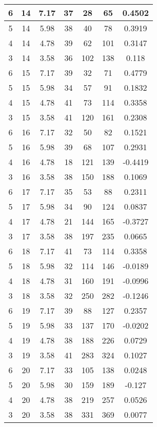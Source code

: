 \documentclass[letterpaper, 12pt]{article}
\begin{document}
\begin{longtable}{|c|c|c|c|c|c|c|}
\hline
6 & 14 & 7.17 & 37 & 28 & 65 & 0.4502 \\
\hline
5 & 14 & 5.98 & 38 & 40 & 78 & 0.3919 \\
\hline
4 & 14 & 4.78 & 39 & 62 & 101 & 0.3147 \\
\hline
3 & 14 & 3.58 & 36 & 102 & 138 & 0.118 \\
\hline
6 & 15 & 7.17 & 39 & 32 & 71 & 0.4779 \\
\hline
5 & 15 & 5.98 & 34 & 57 & 91 & 0.1832 \\
\hline
4 & 15 & 4.78 & 41 & 73 & 114 & 0.3358 \\
\hline
3 & 15 & 3.58 & 41 & 120 & 161 & 0.2308 \\
\hline
6 & 16 & 7.17 & 32 & 50 & 82 & 0.1521 \\
\hline
5 & 16 & 5.98 & 39 & 68 & 107 & 0.2931 \\
\hline
4 & 16 & 4.78 & 18 & 121 & 139 & -0.4419 \\
\hline
3 & 16 & 3.58 & 38 & 150 & 188 & 0.1069 \\
\hline
6 & 17 & 7.17 & 35 & 53 & 88 & 0.2311 \\
\hline
5 & 17 & 5.98 & 34 & 90 & 124 & 0.0837 \\
\hline
4 & 17 & 4.78 & 21 & 144 & 165 & -0.3727 \\
\hline
3 & 17 & 3.58 & 38 & 197 & 235 & 0.0665 \\
\hline
6 & 18 & 7.17 & 41 & 73 & 114 & 0.3358 \\
\hline
5 & 18 & 5.98 & 32 & 114 & 146 & -0.0189 \\
\hline
4 & 18 & 4.78 & 31 & 160 & 191 & -0.0996 \\
\hline
3 & 18 & 3.58 & 32 & 250 & 282 & -0.1246 \\
\hline
6 & 19 & 7.17 & 39 & 88 & 127 & 0.2357 \\
\hline
5 & 19 & 5.98 & 33 & 137 & 170 & -0.0202 \\
\hline
4 & 19 & 4.78 & 38 & 188 & 226 & 0.0729 \\
\hline
3 & 19 & 3.58 & 41 & 283 & 324 & 0.1027 \\
\hline
6 & 20 & 7.17 & 33 & 105 & 138 & 0.0248 \\
\hline
5 & 20 & 5.98 & 30 & 159 & 189 & -0.127 \\
\hline
4 & 20 & 4.78 & 38 & 219 & 257 & 0.0526 \\
\hline
3 & 20 & 3.58 & 38 & 331 & 369 & 0.0077 \\
\hline
\end{longtable}
\end{document}

